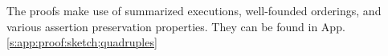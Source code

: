 The proofs make use of summarized executions, well-founded orderings, and various assertion preservation properties. They can be found in App. \ref{s:app:proof:sketch;quadruples}
%
% 
%

%
